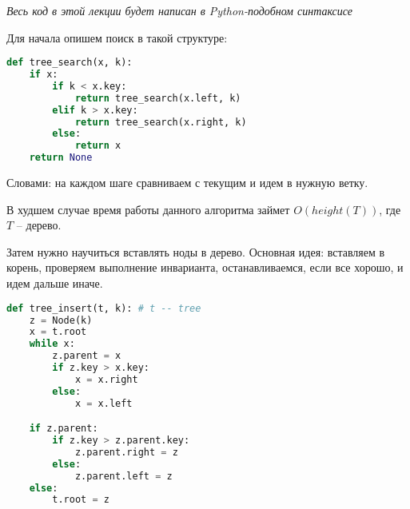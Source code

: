 \documentclass[../main.tex]{subfiles}
\begin{document}
	\textit{Весь код в этой лекции будет написан в Python-подобном синтаксисе}	
	
	Для начала опишем поиск в такой структуре:
	\begin{lstlisting}[language=python]
def tree_search(x, k):
    if x:
        if k < x.key:
            return tree_search(x.left, k)
        elif k > x.key:
            return tree_search(x.right, k)
        else:
            return x
    return None
	\end{lstlisting}
	
	Словами: на каждом шаге сравниваем с текущим и идем в нужную ветку.
	
	\begin{time}
		В худшем случае время работы данного алгоритма займет $O(height(T))$, где $T$ -- дерево.
	\end{time}
	
	Затем нужно научиться вставлять ноды в дерево. Основная идея: вставляем в корень, проверяем выполнение инварианта, останавливаемся, если все хорошо, и идем дальше иначе. 
	
	\begin{lstlisting}[language=python]
def tree_insert(t, k): # t -- tree
    z = Node(k)
    x = t.root
    while x:
	    z.parent = x
        if z.key > x.key:
            x = x.right
        else:
            x = x.left

    if z.parent:
        if z.key > z.parent.key:
            z.parent.right = z
        else:
            z.parent.left = z
    else:
        t.root = z
	\end{lstlisting}
	
	
	
	
	
	
	
	
	
	
	
	
	
	
	
	
	
	
	
	
\end{document}
